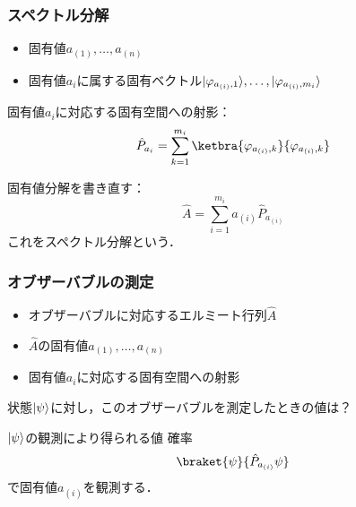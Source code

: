 \documentclass[
    10pt,
    ]{sotsu-beamer}
\begin{document}
\begin{frame}
    \frametitle{スペクトル分解}

    \begin{itemize}
        \item {}固有値$a_{(1)}, \dots, a_{(n)}$
        \item 固有値$a_i$に属する固有ベクトル$\lvert\varphi_{a_{(i)}, 1}\rangle, \dots, \lvert\varphi_{a_{(i)}, m_i}\rangle$
    \end{itemize}

    固有値$a_i$に対応する固有空間への\alert{射影}：
    \begin{equation*}
        \hat{P}_{a_i} = \sum_{k = 1}^{m_i} \ketbra{\varphi_{a_{(i)}, k}}{\varphi_{a_{(i)}, k}}
    \end{equation*}

    固有値分解を書き直す：
    \begin{equation}
        \hat{A} = \sum_{i = 1}^{m_i} a_{(i)} \hat{P}_{a_{(i)}}
    \end{equation}
    これを\alert{スペクトル分解}という．

\end{frame}


\begin{frame}
    \frametitle{オブザーバブルの測定}

    \begin{itemize}
        \item オブザーバブルに対応するエルミート行列$\hat{A}$
        \item $\hat{A}$の固有値$a_{(1)}, \dots, a_{(n)}$
        \item 固有値$a_i$に対応する固有空間への射影
    \end{itemize}

    状態$\lvert\psi\rangle$に対し，このオブザーバブルを測定したときの値は？

    \pause 

    \begin{block}{$\lvert\psi\rangle$の観測により得られる値}
        確率
        \begin{equation}
            \label{eq:proposition-of-observable}
            \braket{\psi}{\hat{P}_{a_{(i)}} \psi}
        \end{equation}
        で固有値$a_{(i)}$を観測する．
    \end{block}

\end{frame}
\end{document}
